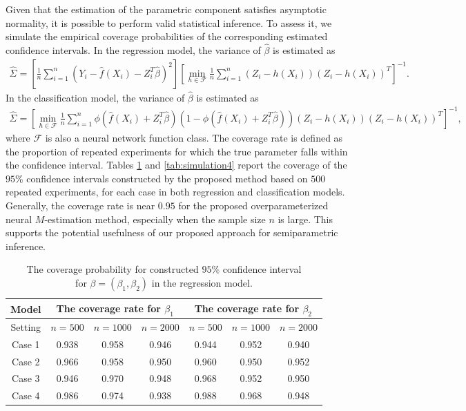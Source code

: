 Given that the estimation of the parametric component satisfies asymptotic normality, it is possible to perform valid statistical inference. To assess it, we simulate the empirical coverage probabilities of the corresponding estimated confidence intervals.
In the regression model, the variance of $\hat{\beta}$ is estimated as
\begin{align*}
    \hat{\Sigma} = \left[\frac{1}{n}\sum_{i=1}^n (Y_i - \hat{f}(X_i) - Z_i^T\hat{\beta})^2\right]\left[\min_{h \in \mathcal{F}}\frac{1}{n}\sum_{i=1}^n(Z_i - h(X_i))(Z_i - h(X_i))^T\right]^{-1}.
\end{align*}
In the classification model, the variance of $\hat{\beta}$ is estimated as 
\begin{align*}
    \hat{\Sigma} 
    = \left[\min_{h \in \mathcal{F} }\frac{1}{n}\sum_{i=1}^n\phi(\hat{f}(X_i)+Z_i^T\hat{\beta})(1-\phi(\hat{f}(X_i)+Z_i^T\hat{\beta}))(Z_i - h(X_i))(Z_i -h(X_i))^T\right]^{-1},
\end{align*}
where $\mathcal{F}$ is also a neural network function class. 
The coverage rate is defined as the proportion of repeated experiments for which the true parameter falls within the confidence interval. Tables \ref{tab:simulation3} and \ref{tab:simulation4} report the coverage of the $95\%$ confidence intervals constructed by the proposed method based on $500$ repeated experiments, for each case in both regression and classification models.
Generally, the coverage rate is near $0.95$ for the proposed
overparameterized neural $M$-estimation method, especially when the sample size $n$ is large. 
This supports the potential usefulness of our proposed approach for semiparametric inference.



 \begin{table}[tb]
 \centering
\centerfloat
    \caption{The coverage probability for constructed $95\%$ confidence interval \\ for $\beta = (\beta_1,\beta_2)$ in the regression model. }
	\label{tab:simulation3}
	\begin{tabular}{c| ccc|ccc}
 \toprule[1pt]
  Model & \multicolumn{3}{c}{The coverage rate for $\beta_1$} &  \multicolumn{3}{c}{The coverage rate for $\beta_2$}\\
  \hline
 Setting &  $n=500$ &$n=1000$ &$n=2000$&$n=500$ &$n=1000$&$n=2000$ \\
    \midrule[1pt]
    Case 1 & 0.938 & 0.958 & 0.946 & 0.944 & 0.952 & 0.940 \\
    Case 2 &0.966  & 0.958 & 0.950 & 0.960 & 0.950 & 0.952 \\
    Case 3 & 0.946 & 0.970 & 0.948 & 0.968 & 0.952 & 0.950 \\
    Case 4 & 0.986 & 0.974 & 0.938 & 0.988 & 0.968 & 0.948 \\
    \bottomrule[1pt]
	\end{tabular}
  \end{table}
  

